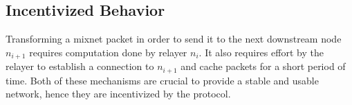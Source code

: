 \subsection{Incentivized Behavior}
\label{sec:incentives:behavior}

Transforming a mixnet packet in order to send it to the next downstream node $n_{i+1}$ requires computation done by relayer $n_i$. It also requires effort by the relayer to establish a connection to $n_{i+1}$ and cache packets for a short period of time. Both of these mechanisms are crucial to provide a stable and usable network, hence they are incentivized by the protocol.